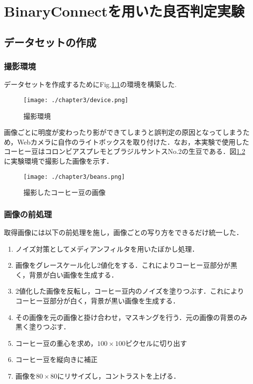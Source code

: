 
\chapter{BinaryConnectを用いた良否判定実験}

\section{データセットの作成}
\subsection{撮影環境}
データセットを作成するためにFig.\ref{fig_camera}の環境を構築した.
\begin{figure}[htbp]
  \begin{center}
    \texttt{[image: ./chapter3/device.png]}
    \caption{撮影環境}
    \label{fig_camera}
  \end{center}
\end{figure}

画像ごとに明度が変わったり影ができてしまうと誤判定の原因となってしまうため，Webカメラに自作のライトボックスを取り付けた．なお，本実験で使用したコーヒー豆はコロンビアスプレモとブラジルサントスNo.2の生豆である．図\ref{fig_beans}に実験環境で撮影した画像を示す．
\begin{figure}[htbp]
  \begin{center}
    \texttt{[image: ./chapter3/beans.png]}
    \caption{撮影したコーヒー豆の画像}
    \label{fig_beans}
  \end{center}
\end{figure}

\subsection{画像の前処理}
取得画像には以下の前処理を施し，画像ごとの写り方をできるだけ統一した．
\begin{enumerate}
  \item ノイズ対策としてメディアンフィルタを用いたぼかし処理．
  \item 画像をグレースケール化し2値化をする．これによりコーヒー豆部分が黒く，背景が白い画像を生成する．
  \item 2値化した画像を反転し，コーヒー豆内のノイズを塗りつぶす．これによりコーヒー豆部分が白く，背景が黒い画像を生成する．
  \item その画像を元の画像と掛け合わせ，マスキングを行う．元の画像の背景のみ黒く塗りつぶす．
  \item コーヒー豆の重心を求め，$100\times 100$ピクセルに切り出す
  \item コーヒー豆を縦向きに補正
  \item 画像を$80\times 80$にリサイズし，コントラストを上げる．
\end{enumerate}

